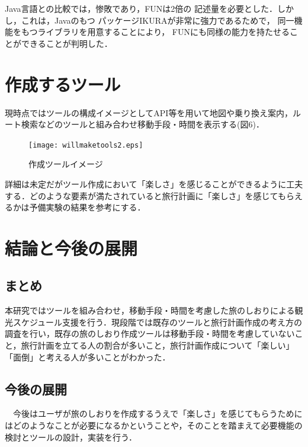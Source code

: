 \documentclass{funthesis}
\begin{document}
Java言語との比較では，惨敗であり，FUNは2倍の
記述量を必要とした．しかし，これは，Javaのもつ
パッケージIKURAが非常に強力であるためで，
同一機能をもつライブラリを用意することにより，
FUNにも同様の能力を持たせることができることが判明した．



\chapter{作成するツール}%

現時点ではツールの構成イメージとしてAPI等を用いて地図や乗り換え案内，ルート検索などのツールと組み合わせ移動手段・時間を表示する(図6)．
\begin{figure}[htpb]
\begin{center}
\texttt{[image: willmaketools2.eps]}
\caption{作成ツールイメージ}
\end{center}
\end{figure}

詳細は未定だがツール作成において「楽しさ」を感じることができるように工夫する．どのような要素が満たされていると旅行計画に「楽しさ」を感じてもらえるかは予備実験の結果を参考にする．\\

\chapter{結論と今後の展開}%

\section{まとめ}

本研究ではツールを組み合わせ，移動手段・時間を考慮した旅のしおりによる観光スケジュール支援を行う．現段階では既存のツールと旅行計画作成の考え方の調査を行い，既存の旅のしおり作成ツールは移動手段・時間を考慮していないこと，旅行計画を立てる人の割合が多いこと，旅行計画作成について「楽しい」「面倒」と考える人が多いことがわかった．\\



\section{今後の展開}
　今後はユーザが旅のしおりを作成するうえで「楽しさ」を感じてもらうためにはどのようなことが必要になるかということや，そのことを踏まえて必要機能の検討とツールの設計，実装を行う．
\end{document}
